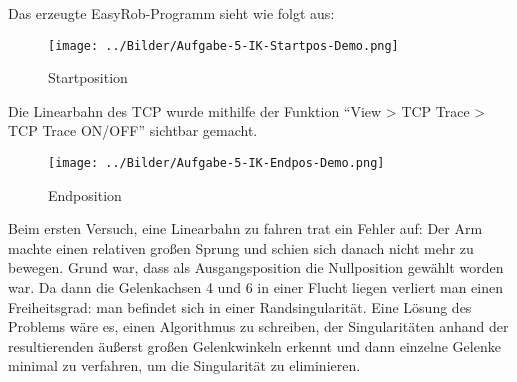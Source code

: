 \documentclass[11pt, a4paper]{article}
\newcommand{\code}{\texttt}
\begin{document}


Das erzeugte EasyRob-Programm sieht wie folgt aus:





\begin{figure}[H]
\texttt{[image: ../Bilder/Aufgabe-5-IK-Startpos-Demo.png]}
\caption{Startposition}
\end{figure}
Die Linearbahn des TCP wurde mithilfe der Funktion \enquote{View > TCP Trace > TCP Trace ON/OFF} sichtbar gemacht.
\begin{figure}[H]
\texttt{[image: ../Bilder/Aufgabe-5-IK-Endpos-Demo.png]}
\caption{Endposition}
\end{figure}

Beim ersten Versuch, eine Linearbahn zu fahren trat ein Fehler auf: Der Arm machte einen relativen großen Sprung und schien sich danach nicht mehr zu bewegen. Grund war, dass als Ausgangsposition die Nullposition gewählt worden war. Da dann die Gelenkachsen 4 und 6 in einer Flucht liegen verliert man einen Freiheitsgrad: man befindet sich in einer Randsingularität. Eine Lösung des Problems wäre es, einen Algorithmus zu schreiben, der Singularitäten anhand der resultierenden äußerst großen Gelenkwinkeln erkennt und dann einzelne Gelenke minimal zu verfahren, um die Singularität zu eliminieren.


\end{document}
